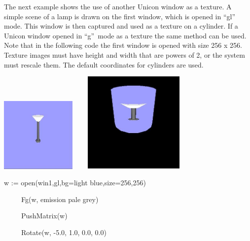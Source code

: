 \documentclass[letterpaper]{article}
\begin{document}
{\bigskip

The next example shows the use of another Unicon window as a
texture. A simple scene of a lamp is drawn on the first window, which
is opened in \textsf{{}``gl''} mode. This window is then captured and
used as a texture on a cylinder. If a Unicon window opened in
\textsf{{}``g''}\texttt{ }mode as a texture the same method can be
used. Note that in the following code the first window is opened with
size 256 x 256. Texture images must have height and width that are
powers of 2, or the system must rescale them. The default coordinates
for cylinders are used.


\bigskip


\bigskip

{\centering{}
 \includegraphics[width=1.4492in,height=1.4335in]{utr9/utr9-img028.jpg} \texttt{ \ \ }
\includegraphics[width=1.939in,height=1.952in]{utr9/utr9-img029.jpg} \texttt{ \ \ }
\par}


\bigskip


\bigskip

{\sffamily
w := open({\textquotedbl}win1{\textquotedbl},{\textquotedbl}gl{\textquotedbl},{\textquotedbl}bg=light
blue{\textquotedbl},{\textquotedbl}size=256,256{\textquotedbl})}

{\sffamily
\ \ \ \ \ Fg(w, {\textquotedbl}emission pale grey{\textquotedbl})}

{\sffamily
\ \ \ \ \ PushMatrix(w)}

{\sffamily
\ \ \ \ \ Rotate(w, -5.0, 1.0, 0.0, 0.0)}

}
\end{document}
